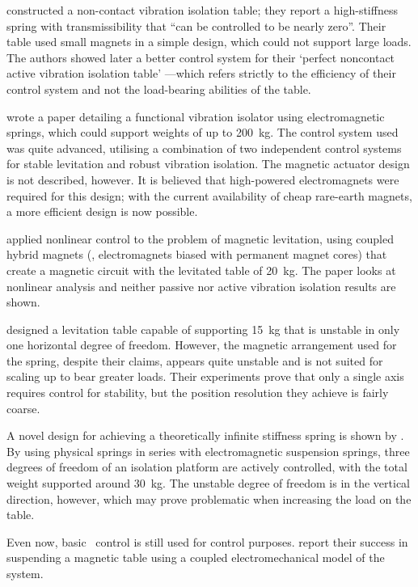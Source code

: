 \textcite{nagaya1993} constructed a non-contact vibration isolation table; they report a high-stiffness spring with transmissibility that \enquote{can be controlled to be nearly zero}.
Their table used small magnets in a simple design, which could not support large loads.
The authors showed later a better control system for their `perfect noncontact active vibration isolation table' \cite{nagaya1995a}—which refers strictly to the efficiency of their control system and not the load-bearing abilities of the table.

\textcite{watanabe1996} wrote a paper detailing a functional vibration isolator using electromagnetic springs, which could support weights of up to
\SI{200}{kg}.
The control system used was quite advanced, utilising a combination of two independent control systems for stable levitation and robust vibration isolation.
The magnetic actuator design is not described, however.
It is believed that high-powered electromagnets were required for this design; with the current availability of cheap rare-earth magnets, a more efficient design is now possible.

\textcite{chang2001} applied nonlinear control to the problem of magnetic levitation, using coupled hybrid magnets (\ie, electromagnets biased with permanent magnet cores) that create a magnetic circuit with the levitated table of \SI{20}{kg}.
The paper looks at nonlinear analysis and neither passive nor active vibration isolation results are shown.

\textcite{choi2003} designed a levitation table capable of supporting \SI{15}{kg} that is unstable in only one horizontal degree of freedom.
However, the magnetic arrangement used for the spring, despite their claims, appears quite unstable and is not suited for scaling up to bear greater loads.
Their experiments prove that only a single axis requires control for stability, but the position resolution they achieve is fairly coarse.

A novel design for achieving a theoretically infinite stiffness spring is shown by \textcite{mizuno2003a,mizuno2003b}.
By using physical springs in series with electromagnetic suspension springs, three degrees of freedom of an isolation platform are actively controlled, with the total weight supported around \SI{30}{kg}.
The unstable degree of freedom is in the vertical direction, however, which may prove problematic when increasing the load on the table.

Even now, basic \PID\ control is still used for control purposes.
\textcite{li2007} report their success in suspending a magnetic table using a coupled electromechanical model of the system.

